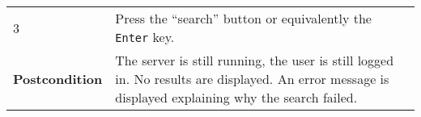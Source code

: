 \begin{longtable}[c]{@{}ll@{}}
\begin{minipage}[t]{0.31\columnwidth}
3
\strut\end{minipage} &
\begin{minipage}[t]{0.63\columnwidth}\raggedright\strut
Press the ``search'' button or equivalently the \texttt{Enter} key.
\strut\end{minipage}\tabularnewline
\begin{minipage}[t]{0.31\columnwidth}\raggedright\strut
\textbf{Postcondition}
\strut\end{minipage} &
\begin{minipage}[t]{0.63\columnwidth}\raggedright\strut
The server is still running, the user is still logged in. No results are
displayed. An error message is displayed explaining why the search
failed.
\strut\end{minipage}\tabularnewline
\bottomrule
\end{longtable}

